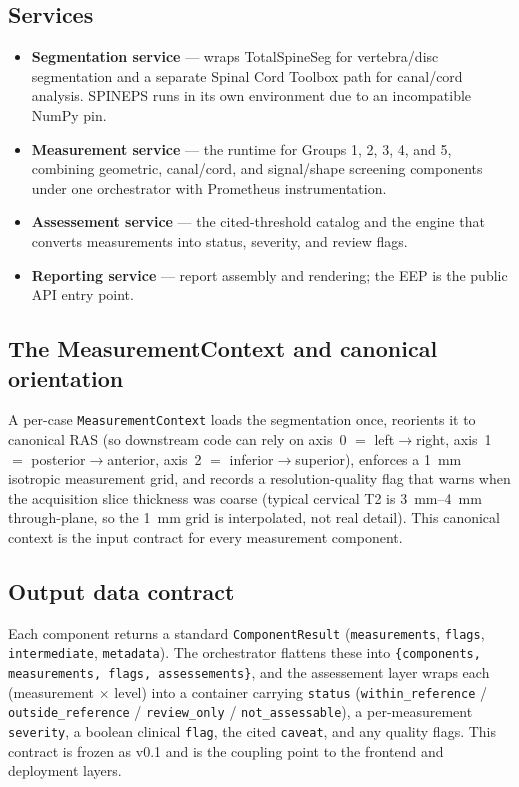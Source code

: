 \subsection{Services}
\begin{itemize}[leftmargin=*]
  \item \textbf{Segmentation service} --- wraps TotalSpineSeg for vertebra/disc segmentation and a
  separate Spinal Cord Toolbox path for canal/cord analysis. SPINEPS runs in its own environment due to
  an incompatible NumPy pin.
  \item \textbf{Measurement service} --- the runtime for Groups 1, 2, 3, 4, and 5, combining geometric,
  canal/cord, and signal/shape screening components under one orchestrator with Prometheus instrumentation.
  \item \textbf{Assessement service} --- the cited-threshold catalog and the engine that converts
  measurements into status, severity, and review flags.
  \item \textbf{Reporting service} --- report assembly and rendering; the EEP is the public API entry point.
\end{itemize}

\subsection{The MeasurementContext and canonical orientation}
A per-case \texttt{MeasurementContext} loads the segmentation once, reorients it to canonical RAS (so
downstream code can rely on axis~0 $=$ left$\rightarrow$right, axis~1 $=$
posterior$\rightarrow$anterior, axis~2 $=$ inferior$\rightarrow$superior), enforces a
\SI{1}{\milli\meter} isotropic measurement grid, and records a resolution-quality flag that warns when
the acquisition slice thickness was coarse (typical cervical T2 is \SIrange{3}{4}{\milli\meter}
through-plane, so the \SI{1}{\milli\meter} grid is interpolated, not real detail). This canonical
context is the input contract for every measurement component.

\subsection{Output data contract}
Each component returns a standard \texttt{ComponentResult} (\texttt{measurements}, \texttt{flags},
\texttt{intermediate}, \texttt{metadata}). The orchestrator flattens these into
\texttt{\{components, measurements, flags, assessements\}}, and the assessement layer wraps each
(measurement $\times$ level) into a container carrying \texttt{status} (\texttt{within\_reference} /
\texttt{outside\_reference} / \texttt{review\_only} / \texttt{not\_assessable}), a per-measurement
\texttt{severity}, a boolean clinical \texttt{flag}, the cited \texttt{caveat}, and any quality flags.
This contract is frozen as v0.1 and is the coupling point to the frontend and deployment layers.
